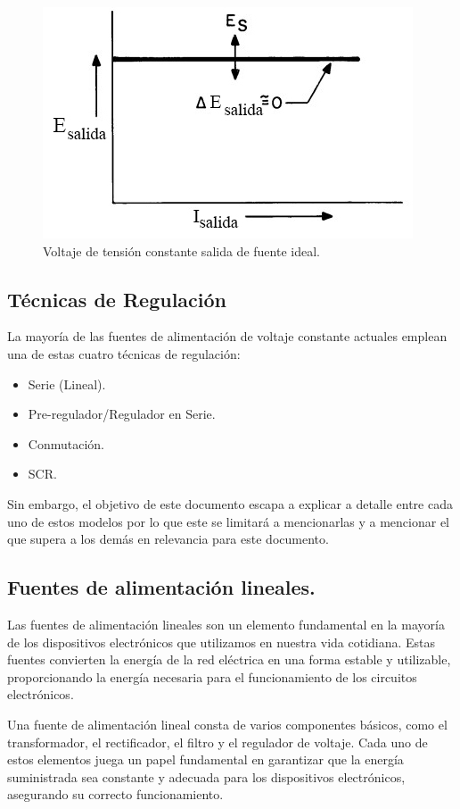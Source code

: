\begin{figure}
    \centering
    \includegraphics[scale=0.4]{./imagenes/salidaidealfuentedc.jpg}
    \caption{Voltaje de tensión constante salida de fuente ideal.}
    \label{F:salidaidealfuentedc}
\end{figure}

\subsection{Técnicas de Regulación}\par 
La mayoría de las fuentes de alimentación de voltaje constante actuales emplean una de estas cuatro técnicas de regulación:
\begin{itemize}
    \item Serie (Lineal).
    \item Pre-regulador/Regulador en Serie.
    \item Conmutación.
    \item SCR.
\end{itemize}\par 
Sin embargo, el objetivo de este documento escapa a explicar a detalle entre cada uno de estos modelos por lo que este se limitará a mencionarlas y a mencionar el que supera a los demás en relevancia para este documento. 
\subsection{Fuentes de alimentación lineales.} \par 
Las fuentes de alimentación lineales son un elemento fundamental en la mayoría de los dispositivos electrónicos que utilizamos en nuestra vida cotidiana. Estas fuentes convierten la energía de la red eléctrica en una forma estable y utilizable, proporcionando la energía necesaria para el funcionamiento de los circuitos electrónicos. \par
Una fuente de alimentación lineal consta de varios componentes básicos, como el transformador, el rectificador, el filtro y el regulador de voltaje. Cada uno de estos elementos juega un papel fundamental en garantizar que la energía suministrada sea constante y adecuada para los dispositivos electrónicos, asegurando su correcto funcionamiento.


